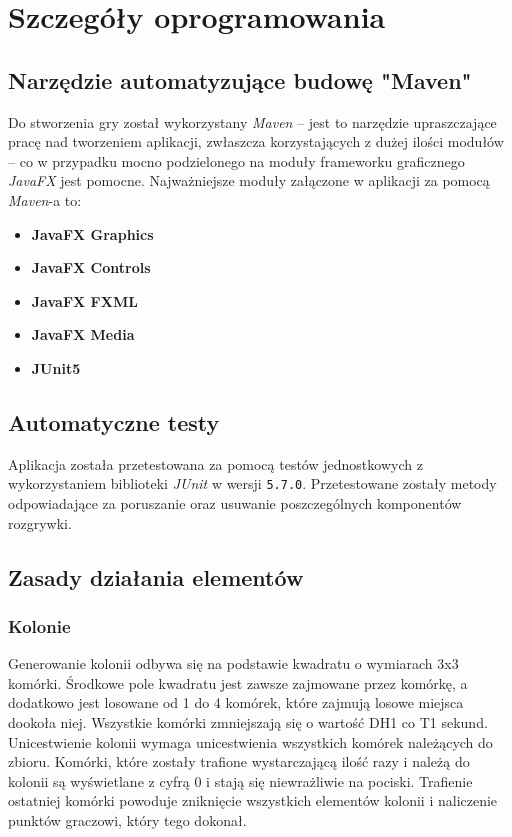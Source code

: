 \documentclass[11pt,a4paper]{report}
\begin{document}
\section{Szczegóły oprogramowania}
\subsection {Narzędzie automatyzujące budowę "Maven"}
Do stworzenia gry został wykorzystany \textsl{Maven} -- jest to narzędzie upraszczające pracę nad tworzeniem aplikacji, zwłaszcza korzystających z dużej ilości modułów -- co w przypadku mocno podzielonego na moduły frameworku graficznego \textsl{JavaFX} jest pomocne. Najważniejsze moduły załączone w aplikacji za pomocą \textsl{Maven}-a to:
\begin{itemize}
\item \textbf {JavaFX Graphics}
\item \textbf {JavaFX Controls}
\item \textbf {JavaFX FXML}
\item \textbf {JavaFX Media}
\item \textbf {JUnit5}
\end{itemize}
\subsection {Automatyczne testy}
Aplikacja została przetestowana za pomocą testów jednostkowych z wykorzystaniem biblioteki \textsl{JUnit} w wersji \texttt{5.7.0}. Przetestowane zostały metody odpowiadające za poruszanie oraz usuwanie poszczególnych komponentów rozgrywki.
\subsection {Zasady działania elementów}
\subsubsection{Kolonie}
Generowanie kolonii odbywa się na podstawie kwadratu o wymiarach 3x3 komórki. Środkowe pole kwadratu jest zawsze zajmowane przez komórkę, a dodatkowo jest losowane od 1 do 4 komórek, które zajmują losowe miejsca dookoła niej. Wszystkie komórki zmniejszają się o wartość DH1 co T1 sekund. Unicestwienie kolonii wymaga unicestwienia wszystkich komórek należących do zbioru. Komórki, które zostały trafione wystarczającą ilość razy i należą do kolonii są wyświetlane z cyfrą 0 i stają się niewrażliwie na pociski. Trafienie ostatniej komórki powoduje zniknięcie wszystkich elementów kolonii i naliczenie punktów graczowi, który tego dokonał.
\end{document}
